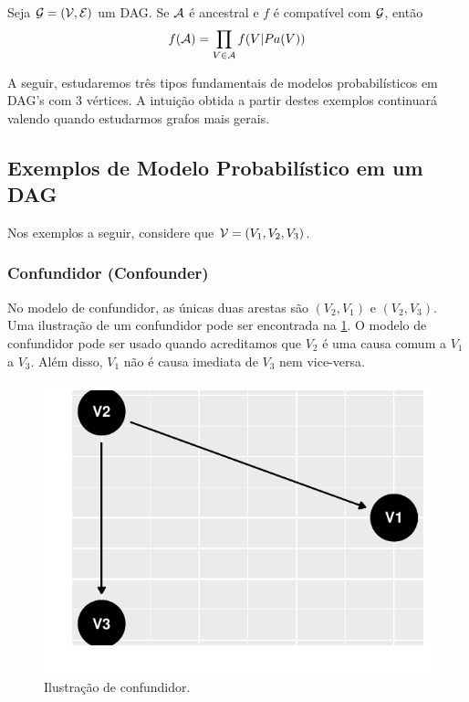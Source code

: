 \begin{lemma}
 \label{lem:anc_fat}
 Seja ${\mathcal G} = ({\mathcal V}, {\mathcal E})$ um DAG.
 Se ${\mathcal A}$ é ancestral e 
 $f$ é compatível com ${\mathcal G}$, então
 \begin{align*}
  f({\mathcal A}) = \prod_{V \in {\mathcal A}} f(V|Pa(V))
 \end{align*}
\end{lemma}

A seguir, estudaremos três tipos fundamentais
de modelos probabilísticos em DAG's com
$3$ vértices. 
A intuição obtida a partir destes
exemplos continuará valendo quando
estudarmos grafos mais gerais.

\subsection{Exemplos de Modelo Probabilístico em um DAG}
\label{sec:dag-ex}

Nos exemplos a seguir, considere que
${\mathcal V} = (V_1, V_2, V_3)$.

\subsubsection{Confundidor (Confounder)}

No modelo de confundidor, 
as únicas duas arestas são 
$(V_2, V_1)$ e $(V_2, V_3)$.
Uma ilustração de um confundidor
pode ser encontrada 
na \cref{fig:confundidor}.
O modelo de confundidor pode ser usado quando
acreditamos que $V_2$ é uma causa comum a
$V_1$ a $V_3$. Além disso,
$V_1$ não é causa imediata de $V_3$ 
nem vice-versa.

\begin{knitrout}
\color{fgcolor}\begin{figure}[t]

{\centering \includegraphics[width=\maxwidth]{./figures/confundidor-1} 

}

\caption[Ilustração de confundidor]{Ilustração de confundidor.}\label{fig:confundidor}
\end{figure}

\end{knitrout}

